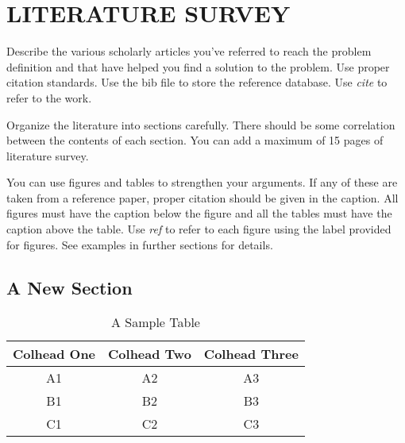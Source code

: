 \chapter{LITERATURE SURVEY}
\par Describe the various scholarly articles you've referred to reach the problem definition and that have helped you find a solution to the problem. Use proper citation standards. Use the bib file to store the reference database. Use \emph{cite} to refer to the work.

\par Organize the literature into sections carefully. There should be some correlation between the contents of each section. You can add a maximum of 15 pages of literature survey.

\par You can use figures and tables to strengthen your arguments. If any of these are taken from a reference paper, proper citation should be given in the caption. All figures must have the caption below the figure and all the tables must have the caption above the table. Use \emph{ref} to refer to each figure using the label provided for figures. See examples in further sections for details.

\section{A New Section}
\begin{table}
\centering
\begin{tabular}{|c|c|c|}
\hline
\textbf{Colhead One} & \textbf{Colhead Two} & \textbf{Colhead Three} \\
\hline
A1 & A2 & A3 \\
\hline
B1 & B2 & B3 \\
\hline
C1 & C2 & C3 \\
\hline
\end{tabular}
\caption{A Sample Table}
\end{table}
\newpage
